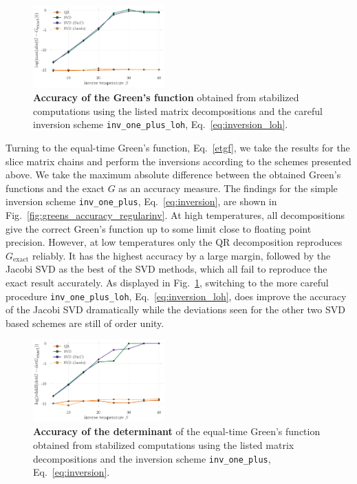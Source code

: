 \documentclass[%
 reprint,
superscriptaddress,
citeautoscript,
showpacs,
 amsmath,amssymb,
 aps,
 prb,
longbibliography,
]{revtex4-1}
\begin{document}
\begin{figure}[t]
	\includegraphics[width=0.45\textwidth]{figures/accuracy_greens_svd_loh.pdf}
	\caption{\textbf{Accuracy of the Green's function} obtained from stabilized computations using the listed matrix decompositions and the careful inversion scheme \texttt{inv\_one\_plus\_loh}, Eq.~\ref{eq:inversion_loh}. \label{fig:greens_accuracy_loh}}
\end{figure}

Turning to the equal-time Green's function, Eq.~\eqref{etgf}, we take the results for the slice matrix chains and perform the inversions according to the schemes presented above. We take the maximum absolute difference between the obtained Green's functions and the exact $G$ as an accuracy measure. The findings for the simple inversion scheme \texttt{inv\_one\_plus}, Eq.~\ref{eq:inversion}, are shown in Fig.~\ref{fig:greens_accuracy_regularinv}. At high temperatures, all decompositions give the correct Green's function up to some limit close to floating point precision. However, at low temperatures only the QR decomposition reproduces $G_{\textrm{exact}}$ reliably. It has the highest accuracy by a large margin, followed by the Jacobi SVD as the best of the SVD methods, which all fail to reproduce the exact result accurately. As displayed in Fig.~\ref{fig:greens_accuracy_loh}, switching to the more careful procedure \texttt{inv\_one\_plus\_loh}, Eq.~\ref{eq:inversion_loh}, does improve the accuracy of the Jacobi SVD dramatically while the deviations seen for the other two SVD based schemes are still of order unity.
\begin{figure}
	\includegraphics[width=0.45\textwidth]{figures/accuracy_det_svd_regularinv.pdf}
	\caption{\textbf{Accuracy of the determinant} of the equal-time Green's function obtained from stabilized computations using the listed matrix decompositions and the inversion scheme \texttt{inv\_one\_plus}, Eq.~\ref{eq:inversion}. \label{fig:det_accuracy_regularinv}}
\end{figure}
\end{document}
